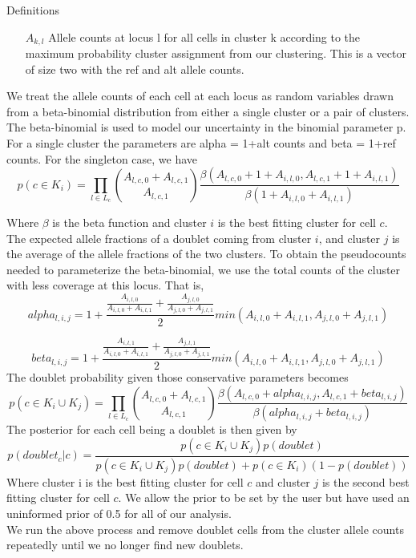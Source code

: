 Definitions
\begin{itemize}
\item[$A_{k,l}$] Allele counts at locus l for all cells in cluster k according to the maximum probability cluster assignment from our clustering. This is a vector of size two with the ref and alt allele counts.
\end{itemize}

We treat the allele counts of each cell at each locus as random variables drawn from a beta-binomial distribution from either a single cluster or a pair of clusters. The beta-binomial is used to model our uncertainty in the binomial parameter p. For a single cluster the parameters are alpha = 1+alt counts and beta = 1+ref counts. 
For the singleton case, we have 
\begin{equation}
p(c \in K_i) = \prod_{l \in L_c} {A_{l,c,0} + A_{l,c,1}  \choose A_{l,c,1}} \frac{\beta(A_{l,c,0} + 1 + A_{i,l,0}, A_{l,c,1} + 1 + A_{i,l,1})}{\beta(1+A_{i,l,0} + A_{i,l,1})}
\end{equation}


Where $\beta$ is the beta function and cluster $i$ is the best fitting cluster for cell $c$. \\
The expected allele fractions of a doublet coming from cluster $i$, and cluster $j$ is the average of the allele fractions of the two clusters. To obtain the pseudocounts needed to parameterize the beta-binomial, we use the total counts of the cluster with less coverage at this locus. That is, 
\begin{equation}
alpha_{l,i,j} = 1 + \frac{\frac{A_{i,l,0}}{A_{i,l,0}+A_{i,l,1}} + \frac{A_{j,l,0}}{A_{j,l,0}+A_{j,l,1}}}{2}min(A_{i,l,0}+A_{i,l,1}, A_{j,l,0}+A_{j,l,1})
\end{equation}

\begin{equation}
beta_{l,i,j} = 1 + \frac{\frac{A_{i,l,1}}{A_{i,l,0}+A_{i,l,1}} + \frac{A_{j,l,1}}{A_{j,l,0}+A_{j,l,1}}}{2}min(A_{i,l,0}+A_{i,l,1}, A_{j,l,0}+A_{j,l,1})
\end{equation}
The doublet probability given those conservative parameters becomes
\begin{equation}
p(c \in K_i \cup K_j) = \prod_{l \in L_c}  {A_{l,c,0} + A_{l,c,1}  \choose A_{l,c,1}}\frac{\beta(A_{l,c,0} + alpha_{l,i,j}, A_{l,c,1} + beta_{l,i,j})}{\beta(alpha_{l,i,j} + beta_{l,i,j})}
\end{equation}
The posterior for each cell being a doublet is then given by
\begin{equation}
p(doublet_c | c) = \frac{p(c \in K_i \cup K_j)p(doublet)}{p(c \in K_i \cup K_j)p(doublet) + p(c \in K_i)(1-p(doublet))}
\end{equation}
Where cluster i is the best fitting cluster for cell $c$ and cluster $j$ is the second best fitting cluster for cell $c$. We allow the prior to be set by the user but have used an uninformed prior of 0.5 for all of our analysis. \\
We run the above process and remove doublet cells from the cluster allele counts repeatedly until we no longer find new doublets. \\ \\





